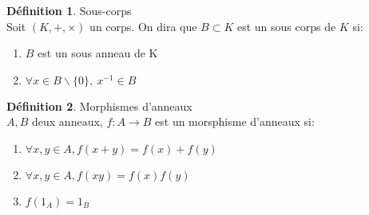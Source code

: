 \documentclass[fleqn]{article}
\theoremstyle{definition} \newtheorem*{defi}{D\'efinition}
\theoremstyle{definition} \newtheorem*{theo}{Th\'eor\`eme}
\theoremstyle{definition} \newtheorem*{coro}{Corollaire}
\theoremstyle{definition} \newtheorem*{nota}{Notation}
\theoremstyle{remark} \newtheorem*{rqs}{Remarques}
\theoremstyle{definition} \newtheorem*{prop}{Propri\'et\'e}
\begin{document}
\begin{defi} Sous-corps \\
	Soit $(K,+,\times)$ un corps. On dira que $B \subset K$ est un sous corps de $K$ si:
	\begin{enumerate}
		\item $B$ est un sous anneau de K
		\item $\forall x \in B\backslash\{0\},\ x^{-1} \in B$
	\end{enumerate}
\end{defi}

\begin{defi} Morphismes d'anneaux \\
	$A, B$ deux anneaux, $f:A \rightarrow B$ est un morsphisme d'anneaux si:
	\begin{enumerate}
		\item $\forall x,y \in A, f(x+y) = f(x) + f(y)$
		\item $\forall x,y \in A, f(xy) = f(x)f(y)$
		\item $f(1_A) = 1_B$
	\end{enumerate}
\end{defi}
\end{document}

